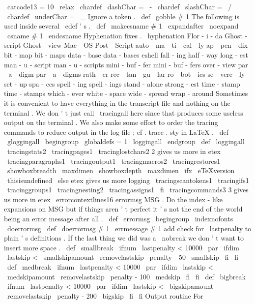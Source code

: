 {
\
catcode13
=
10
\
relax
}
\
chardef
\
dashChar
=
\
-
\
chardef
\
slashChar
=
\
/
\
chardef
\
underChar
=
\
_
%
Ignore
a
token
.
%
\
def
\
gobble
#
1
{
}
%
The
following
is
used
inside
several
\
edef
'
s
.
\
def
\
makecsname
#
1
{
\
expandafter
\
noexpand
\
csname
#
1
\
endcsname
}
%
Hyphenation
fixes
.
\
hyphenation
{
Flor
-
i
-
da
Ghost
-
script
Ghost
-
view
Mac
-
OS
Post
-
Script
auto
-
ma
-
ti
-
cal
-
ly
ap
-
pen
-
dix
bit
-
map
bit
-
maps
data
-
base
data
-
bases
eshell
fall
-
ing
half
-
way
long
-
est
man
-
u
-
script
man
-
u
-
scripts
mini
-
buf
-
fer
mini
-
buf
-
fers
over
-
view
par
-
a
-
digm
par
-
a
-
digms
rath
-
er
rec
-
tan
-
gu
-
lar
ro
-
bot
-
ics
se
-
vere
-
ly
set
-
up
spa
-
ces
spell
-
ing
spell
-
ings
stand
-
alone
strong
-
est
time
-
stamp
time
-
stamps
which
-
ever
white
-
space
wide
-
spread
wrap
-
around
}
%
Sometimes
it
is
convenient
to
have
everything
in
the
transcript
file
%
and
nothing
on
the
terminal
.
We
don
'
t
just
call
\
tracingall
here
%
since
that
produces
some
useless
output
on
the
terminal
.
We
also
make
%
some
effort
to
order
the
tracing
commands
to
reduce
output
in
the
log
%
file
;
cf
.
trace
.
sty
in
LaTeX
.
%
\
def
\
gloggingall
{
\
begingroup
\
globaldefs
=
1
\
loggingall
\
endgroup
}
%
\
def
\
loggingall
{
%
\
tracingstats2
\
tracingpages1
\
tracinglostchars2
%
2
gives
us
more
in
etex
\
tracingparagraphs1
\
tracingoutput1
\
tracingmacros2
\
tracingrestores1
\
showboxbreadth
\
maxdimen
\
showboxdepth
\
maxdimen
\
ifx
\
eTeXversion
\
thisisundefined
\
else
%
etex
gives
us
more
logging
\
tracingscantokens1
\
tracingifs1
\
tracinggroups1
\
tracingnesting2
\
tracingassigns1
\
fi
\
tracingcommands3
%
3
gives
us
more
in
etex
\
errorcontextlines16
}
%
%
errormsg
{
MSG
}
.
Do
the
index
-
like
expansions
on
MSG
but
if
things
%
aren
'
t
perfect
it
'
s
not
the
end
of
the
world
being
an
error
message
%
after
all
.
%
\
def
\
errormsg
{
\
begingroup
\
indexnofonts
\
doerrormsg
}
\
def
\
doerrormsg
#
1
{
\
errmessage
{
#
1
}
}
%
add
check
for
\
lastpenalty
to
plain
'
s
definitions
.
If
the
last
thing
%
we
did
was
a
\
nobreak
we
don
'
t
want
to
insert
more
space
.
%
\
def
\
smallbreak
{
\
ifnum
\
lastpenalty
<
10000
\
par
\
ifdim
\
lastskip
<
\
smallskipamount
\
removelastskip
\
penalty
-
50
\
smallskip
\
fi
\
fi
}
\
def
\
medbreak
{
\
ifnum
\
lastpenalty
<
10000
\
par
\
ifdim
\
lastskip
<
\
medskipamount
\
removelastskip
\
penalty
-
100
\
medskip
\
fi
\
fi
}
\
def
\
bigbreak
{
\
ifnum
\
lastpenalty
<
10000
\
par
\
ifdim
\
lastskip
<
\
bigskipamount
\
removelastskip
\
penalty
-
200
\
bigskip
\
fi
\
fi
}
%
Output
routine
%
%
For
